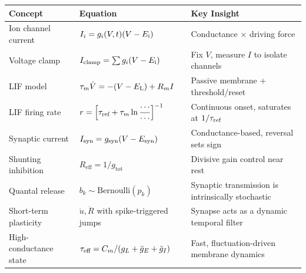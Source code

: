 \begin{chaptersummary}

\begin{center}
\renewcommand{\arraystretch}{1.6}
\begin{tabularx}{\textwidth}{@{}l X X@{}}
  \toprule
  \textbf{Concept} & \textbf{Equation} & \textbf{Key Insight} \\
  \midrule
  Ion channel current &
  $I_i = g_i(V,t)(V - E_{\mathrm{i}})$ &
  Conductance $\times$ driving force \\
  Voltage clamp &
  $I_{\text{clamp}} = \sum g_i(V - E_{\mathrm{i}})$ &
  Fix $V$, measure $I$ to isolate channels \\
  LIF model &
  $\displaystyle \tau_m \dot{V} = -(V - E_{\mathrm{L}}) + R_m I$ &
  Passive membrane + threshold/reset \\
  LIF firing rate &
  $\displaystyle r = \Bigl[\tau_{\text{ref}} + \tau_m\ln\frac{\cdots}{\cdots}\Bigr]^{-1}$ &
  Continuous onset, saturates at $1/\tau_{\text{ref}}$ \\
  Synaptic current &
  $I_{\text{syn}} = g_{\text{syn}}(V - E_{\mathrm{\text{syn}}})$ &
  Conductance-based, reversal sets sign \\
  Shunting inhibition &
  $R_{\text{eff}} = 1/g_{\text{tot}}$ &
  Divisive gain control near rest \\
  Quantal release &
  $b_k \sim \mathrm{Bernoulli}(p_k)$ &
  Synaptic transmission is intrinsically stochastic \\
  Short-term plasticity &
  $\dot u,\dot R$ with spike-triggered jumps &
  Synapse acts as a dynamic temporal filter \\
  High-conductance state &
  $\tau_{\text{eff}}=C_m/(g_L+\bar g_E+\bar g_I)$ &
  Fast, fluctuation-driven membrane dynamics \\
  \bottomrule
\end{tabularx}
\end{center}

\end{chaptersummary}

